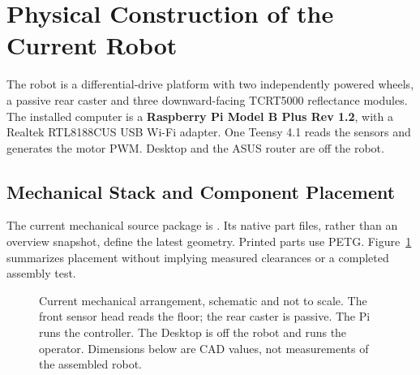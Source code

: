 \clearpage
\section{Physical Construction of the Current Robot}
\label{sec:mechanical-design}
The robot is a differential-drive platform with two independently powered wheels, a passive rear caster and three downward-facing TCRT5000 reflectance modules. The installed computer is a \textbf{Raspberry Pi Model B Plus Rev 1.2}, with a Realtek RTL8188CUS USB Wi-Fi adapter. One Teensy 4.1 reads the sensors and generates the motor PWM. Desktop and the ASUS router are off the robot.

\subsection{Mechanical Stack and Component Placement}
The current mechanical source package is . Its native part files, rather than an overview snapshot, define the latest geometry. Printed parts use PETG. Figure~\ref{fig:current-physical} summarizes placement without implying measured clearances or a completed assembly test.

\begin{figure}[H]
\centering
\resizebox{\linewidth}{!}{}
\caption{Current mechanical arrangement, schematic and not to scale. The front sensor head reads the floor; the rear caster is passive. The Pi runs the controller. The Desktop is off the robot and runs the operator. Dimensions below are CAD values, not measurements of the assembled robot.}
\label{fig:current-physical}
\end{figure}

